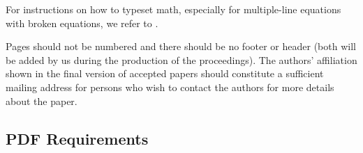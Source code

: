 \documentclass[conference,a4paper]{IEEEtran}
\begin{document}


For instructions on how to typeset math, especially for multiple-line
equations with broken equations, we refer to \cite{typesetmoser}.

Pages should not be numbered and there should be no footer or header
(both will be added by us during the production of the
proceedings). The authors' affiliation shown in the final version of
accepted papers should constitute a sufficient mailing address for
persons who wish to contact the authors for more details about the
paper.


\subsection{PDF Requirements}
\label{sec:pdf-requirements}
\end{document}
